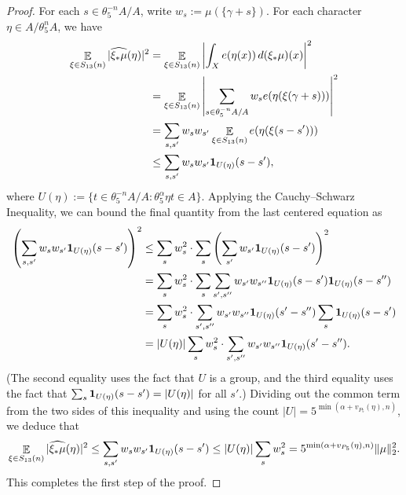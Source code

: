 \documentclass[11pt]{amsart}
\theoremstyle{definition}
\DeclareMathOperator*{\E}{\mathbb{E}}
\begin{document}
\begin{proof}
For each $s \in \theta_5^{-n}A/A$, write $w_s:= \mu(\{\gamma+s\})$.
For each character $\eta \in A/\theta_5^n A$, we have
\begin{align*}
\E_{\xi \in S_{13}(n)} |\widehat{\xi_*\mu}(\eta)|^2 &=\E_{\xi \in S_{13}(n)} \left| \int_X e(\eta(x)) \,d(\xi_* \mu)(x) \right|^2 \\ 
&= \E_{\xi \in S_{13}(n)} \left|\sum_{s \in \theta_5^{-n}A/A}w_s e(\eta(\xi( \gamma+s))) \right|^2 \\
&= \sum_{s, s'} w_s w_{s'} \E_{\xi \in S_{13}(n)} e(\eta(\xi(s - s'))) \\
& \leq \sum_{s, s'} w_s w_{s'} {\bf 1}_{U(\eta)}(s-s'),
\end{align*}
where $U(\eta):=\{t \in \theta_5^{-n}A/A: \theta_5^\alpha\eta t \in A\}$.
Applying the Cauchy--Schwarz Inequality, we can bound the final quantity from the last centered equation as
\begin{align*}
\left(\sum_{s,s'} w_s w_{s'} {\bf 1}_{U(\eta)}(s-s')\right)^2 & \leq \sum_s w_s^2 \cdot \sum_s \left(\sum_{s'} w_{s'} {\bf 1}_{U(\eta)}(s-s')\right)^2\\
 &= \sum_s w_s^2 \cdot \sum_s \sum_{s',s''} w_{s'}w_{s''}{\bf 1}_{U(\eta)}(s-s'){\bf 1}_{U(\eta)}(s-s'')\\
 &=\sum_s w_s^2 \cdot \sum_{s',s''} w_{s'}w_{s''}{\bf 1}_{U(\eta)}(s'-s'')\sum_{s}{\bf 1}_{U(\eta)}(s-s')\\
 &=|U(\eta)|\sum_{s}w_s^2 \cdot \sum_{s',s''} w_{s'} w_{s''} {\bf 1}_{U(\eta)}(s'-s'').
\end{align*}
(The second equality uses the fact that $U$ is a group, and the third equality uses the fact that $\sum_{s}{\bf 1}_{U(\eta)}(s-s')=|U(\eta)|$ for all $s'$.)  Dividing out the common term from the two sides of this inequality and using the count $|U|=5^{\min(\alpha+v_{P_5}(\eta),n)}$, we deduce that
$$\E_{\xi \in S_{13}(n)} |\widehat{\xi_*\mu}(\eta)|^2 \leq \sum_{s,s'} w_s w_{s'} {\bf 1}_{U(\eta)}(s-s') \leq |U(\eta)|\sum_{s}w_s^2= 5^{\min(\alpha+v_{P_5}(\eta),n)} \|\mu\|_2^2.$$
This completes the first step of the proof.


\end{proof}
\end{document}
